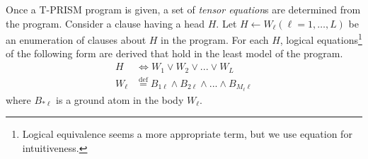 \documentclass[a4paper]{report}
\newcommand{\defeq}{\ensuremath{\stackrel{\mathrm{def}}{=}}}
\begin{document}
Once a T-PRISM program is given, a set of {\it tensor equation\/}s are
determined from the program. Consider a  clause having a head $H$. Let
$H  \leftarrow  W_{\ell}  (\ell  =1,\ldots,L)$ be  an  enumeration  of
clauses   about  $H$   in   the  program.   For   each  $H$,   logical
equations\footnote{
	Logical equivalence seems a more appropriate term, but we use equation
	for intuitiveness.
} of the following form are derived that hold in the least model of
the program.
%
\begin{align} \nonumber
H &\Leftrightarrow W_{1} \vee W_{2} \vee ... \vee W_{L} \\
W_{\ell} &\defeq B_{1\ell} \wedge B_{2\ell} \wedge ... \wedge B_{M_\ell \ell}
\label{eq:logic_eqs}
\end{align}
%
where $B_{*\ell}$ is a ground atom in the body $W_{\ell}$.
\end{document}
